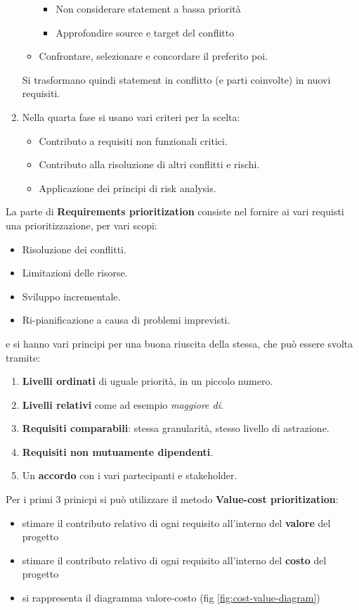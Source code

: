 \begin{enumerate}
\begin{itemize}
\begin{itemize}
                              \item Non considerare statement a bassa priorità
                              \item Approfondire source e target del conflitto
                        \end{itemize}
                  \item Confrontare, selezionare e concordare il preferito poi.
            \end{itemize}
            Si trasformano quindi statement in conflitto (e parti coinvolte) in nuovi requisiti.
      \item Nella quarta fase si usano vari criteri per la scelta:
            \begin{itemize}
                  \item Contributo a requisiti non funzionali critici.
                  \item Contributo alla risoluzione di altri conflitti e rischi.
                  \item Applicazione dei principi di risk analysis.
            \end{itemize}
\end{enumerate}

La parte di \textbf{Requirements prioritization} consiste nel fornire ai vari
requisti una prioritizzazione, per vari scopi:
\begin{itemize}
    \item Risoluzione dei conflitti.
    \item Limitazioni delle risorse.
    \item Sviluppo incrementale.
    \item Ri-pianificazione a causa di problemi imprevisti.
\end{itemize}
e si hanno vari principi per una buona riuscita della stessa, che può essere
svolta tramite:
\begin{enumerate}
    \item \textbf{Livelli ordinati} di uguale priorità, in un piccolo numero.
    \item \textbf{Livelli relativi} come ad esempio \textit{maggiore di}.
    \item \textbf{Requisiti comparabili}: stessa granularità, stesso livello di
          astrazione.
    \item \textbf{Requisiti non mutuamente dipendenti}.
    \item Un \textbf{accordo} con i vari partecipanti e stakeholder.
\end{enumerate}
Per i primi 3 prinicpi si può utilizzare il metodo \textbf{Value-cost	prioritization}:
\begin{itemize}
	\item stimare il contributo relativo di ogni requisito all'interno del 
      \textbf{valore} del progetto
	\item stimare il contributo relativo di ogni requisito all'interno del 
      \textbf{costo} del progetto
	\item si rappresenta il diagramma valore-costo (fig \ref{fig:cost-value-diagram})
\end{itemize}

